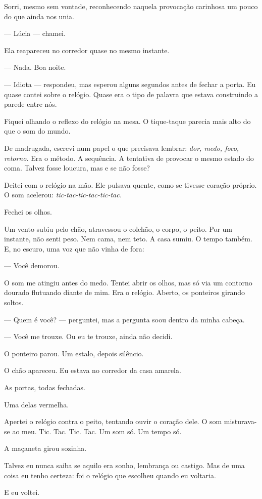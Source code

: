 Sorri, mesmo sem vontade, reconhecendo naquela provocação carinhosa um pouco do que ainda nos unia.

— Lúcia — chamei.

Ela reapareceu no corredor quase no mesmo instante.

— Nada. Boa noite.

— Idiota — respondeu, mas esperou alguns segundos antes de fechar a porta. Eu quase contei sobre o relógio. Quase era o tipo de palavra que estava construindo a parede entre nós.

\medskip

Fiquei olhando o reflexo do relógio na mesa. O tique-taque parecia mais alto do que o som do mundo.

\medskip

De madrugada, escrevi num papel o que precisava lembrar:  
\emph{dor, medo, foco, retorno.}  
Era o método. A sequência. A tentativa de provocar o mesmo estado do coma.  
Talvez fosse loucura, mas e se não fosse?

Deitei com o relógio na mão. Ele pulsava quente, como se tivesse coração próprio. O som acelerou:  
\emph{tic-tac-tic-tac-tic-tac.}

Fechei os olhos.

\medskip

Um vento subiu pelo chão, atravessou o colchão, o corpo, o peito.  
Por um instante, não senti peso. Nem cama, nem teto.  
A casa sumiu. O tempo também.  
E, no escuro, uma voz que não vinha de fora:

— Você demorou.

O som me atingiu antes do medo.  
Tentei abrir os olhos, mas só via um contorno dourado flutuando diante de mim.  
Era o relógio. Aberto, os ponteiros girando soltos.

— Quem é você? — perguntei, mas a pergunta soou dentro da minha cabeça.

— Você me trouxe. Ou eu te trouxe, ainda não decidi.

O ponteiro parou. Um estalo, depois silêncio.

O chão apareceu. Eu estava no corredor da casa amarela.

As portas, todas fechadas.

Uma delas vermelha.

\medskip

Apertei o relógio contra o peito, tentando ouvir o coração dele.  
O som misturava-se ao meu.  
Tic. Tac.  
Tic. Tac.  
Um som só.  
Um tempo só.

A maçaneta girou sozinha.

\medskip

Talvez eu nunca saiba se aquilo era sonho, lembrança ou castigo.  
Mas de uma coisa eu tenho certeza: foi o relógio que escolheu quando eu voltaria.

E eu voltei.
